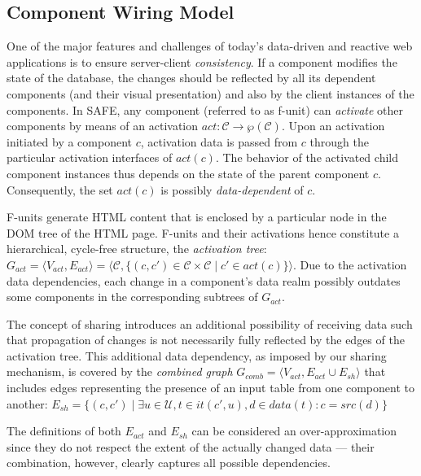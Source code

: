 \documentclass{src/acm_proc_article-sp} \else
\newcommand\cC{\ensuremath{\mathcal{C}}\xspace}
\newcommand\cU{\ensuremath{\mathcal{U}}\xspace}
\newcommand\SAFE{SAFE\xspace}
\begin{document}
\subsection{Component Wiring Model}

One of the major features and challenges of today's data-driven and
reactive web applications is to ensure server-client \emph{consistency}. If a component
modifies the state of the database, the changes should be reflected
by all its dependent components (and their visual presentation) and also by the client instances of the components.
In \SAFE, any component (referred to as f-unit) can \emph{activate} other components by means of an activation $ \mathit{act} \colon \cC \rightarrow \wp(\cC)$.
Upon an activation initiated by a component $c$, activation data is passed from $c$ through the particular activation interfaces of $\mathit{act}(c)$. The behavior of the activated child component instances thus depends on the state of the parent component $c$. Consequently, the set $\mathit{act(c)}$ is possibly \emph{data-dependent} of $c$.

F-units generate HTML content that is enclosed by a particular
node in the DOM tree of the HTML page. F-units and their
activations hence constitute a hierarchical, cycle-free structure,
the \emph{activation tree}:
$ 
  \mathit{G_{act}} = \langle \mathit{V_{act}}, 
  \mathit{E_{act}} \rangle = \langle \cC, \{(c, c') \in \cC 
  \times \cC \mid c' \in \mathit{act(c)}\} \rangle
$.
Due to the activation data dependencies, each change in a component's
data realm possibly outdates some components in the corresponding
subtrees of $G_{\mathit{act}}$.

The concept of sharing introduces an additional possibility of
receiving data such that propagation of changes is not necessarily
fully reflected by the edges of the activation tree. This additional
data dependency, as imposed by our sharing mechanism, is covered by
the \emph{combined graph}
$
  \mathit{G_{comb}} = \langle \mathit{V_{act}}, 
  \mathit{E_{act}} \cup \mathit{E_{sh}} \rangle
$
that includes edges representing the presence of an input table from
one component to another:
$  \mathit{E_{sh}} = \{(c, c') \mid \exists u \in \cU, t 
  \in \mathit{it(c', u)}, d \in \mathit{data(t)} \colon c 
  = \mathit{src(d)}\}
$

The definitions of both $\mathit{E_{act}}$ and $\mathit{E_{sh}}$ can
be considered an over-approximation since they do not respect the
extent of the actually changed data --- their combination, however,
clearly captures all possible dependencies.
\end{document}
